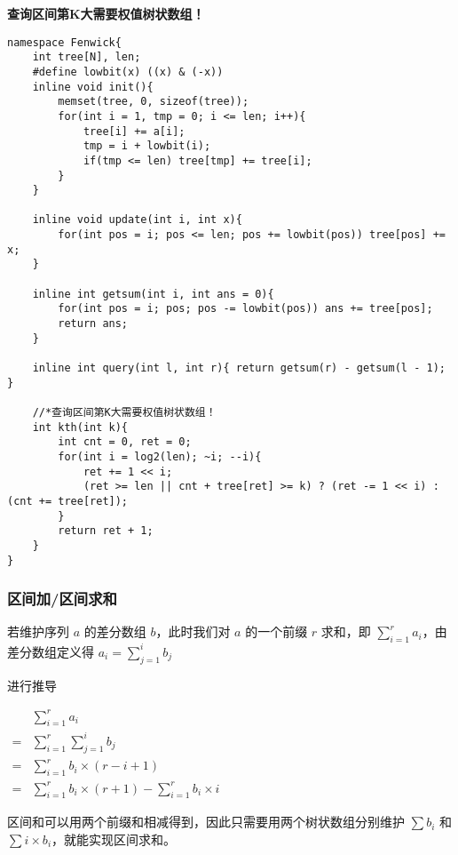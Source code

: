 \documentclass[]{article}
\begin{document}
\textbf{查询区间第K大需要权值树状数组！}

\begin{verbatim}
namespace Fenwick{
    int tree[N], len;
    #define lowbit(x) ((x) & (-x))
    inline void init(){
        memset(tree, 0, sizeof(tree));
        for(int i = 1, tmp = 0; i <= len; i++){
            tree[i] += a[i];
            tmp = i + lowbit(i);
            if(tmp <= len) tree[tmp] += tree[i];
        }
    }

    inline void update(int i, int x){
        for(int pos = i; pos <= len; pos += lowbit(pos)) tree[pos] += x;
    }

    inline int getsum(int i, int ans = 0){
        for(int pos = i; pos; pos -= lowbit(pos)) ans += tree[pos];
        return ans;
    }

    inline int query(int l, int r){ return getsum(r) - getsum(l - 1); }

    //*查询区间第K大需要权值树状数组！
    int kth(int k){
        int cnt = 0, ret = 0;
        for(int i = log2(len); ~i; --i){
            ret += 1 << i;
            (ret >= len || cnt + tree[ret] >= k) ? (ret -= 1 << i) : (cnt += tree[ret]);
        }
        return ret + 1;
    }
}
\end{verbatim}

\hypertarget{ux533aux95f4ux52a0ux533aux95f4ux6c42ux548c}{%
\subsubsection{区间加/区间求和}\label{ux533aux95f4ux52a0ux533aux95f4ux6c42ux548c}}

若维护序列 \(a\) 的差分数组 \(b\)，此时我们对 \(a\) 的一个前缀 \(r\)
求和，即 \(\sum_{i=1}^{r} a_i\)，由差分数组定义得
\(a_i=\sum_{j=1}^i b_j\)

进行推导

\(\begin{aligned} &\sum_{i=1}^{r} a_i\\=&\sum_{i=1}^r\sum_{j=1}^i b_j\\=&\sum_{i=1}^r b_i\times(r-i+1) \\=&\sum_{i=1}^r b_i\times (r+1)-\sum_{i=1}^r b_i\times i \end{aligned}\)

区间和可以用两个前缀和相减得到，因此只需要用两个树状数组分别维护
\(\sum b_i\) 和 \(\sum i \times b_i\)，就能实现区间求和。
\end{document}
